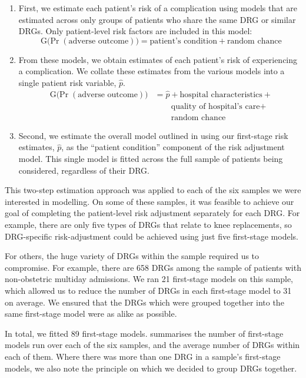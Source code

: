 \documentclass[submission]{grattan}
\begin{document}
\begin{enumerate}
\item
  First, we estimate each patient's risk of a complication using models that are estimated across only groups of patients who share the same DRG or similar DRGs.
Only patient-level risk factors are included in this model:
\[\operatorname{\operatorname{G}(\Pr}{\left( \text{adverse\ outcome} \right))} = \text{patient's condition} + \text{random chance}\]

\item
  From these models, we obtain estimates of each patient's risk of experiencing a complication.
We collate these estimates from the various models into a single patient risk variable, \(\hat{p}\).
\begin{align*}
\operatorname{\operatorname{G}(\Pr}{\left( \text{adverse\ outcome} \right))} &= \hat{p} + \text{hospital characteristics} +{}\\
&\qquad{}\text{quality of hospital's care} + {}\\
&\qquad{}\text{random chance}
\end{align*}


\item
  Second, we estimate the overall model outlined in  using our first-stage risk estimates, \(\hat{p}\), as the ``patient condition'' component of the risk adjustment model.
This single model is fitted across the full sample of patients being considered, regardless of their DRG.
\end{enumerate}

This two-step estimation approach was applied to each of the six samples we were interested in modelling.
On some of these samples, it was feasible to achieve our goal of completing the patient-level risk adjustment separately for each DRG\@.
For example, there are only five types of DRGs that relate to knee replacements, so DRG-specific risk-adjustment could be achieved using just five first-stage models.

For others, the huge variety of DRGs within the sample required us to compromise.
For example, there are 658 DRGs among the sample of patients with non-obstetric multiday admissions.
We ran 21 first-stage models on this sample, which allowed us to reduce the number of DRGs in each first-stage model to 31 on average.
We ensured that the DRGs which were grouped together into the same first-stage model were as alike as possible.

In total, we fitted 89 first-stage models.
 summarises the number of first-stage models run over each of the six samples, and the average number of DRGs within each of them.
Where there was more than one DRG in a sample's first-stage models, we also note the principle on which we decided to group DRGs together.
\end{document}
